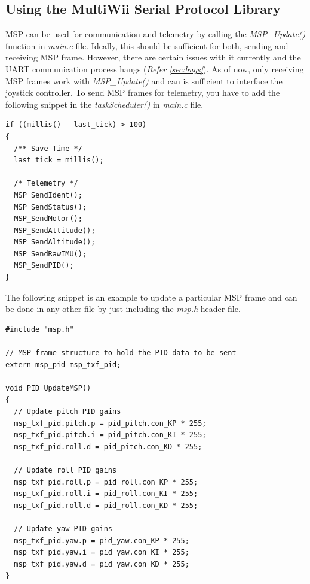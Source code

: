 \documentclass[a4paper,12pt,oneside]{book}
\begin{document}
\subsection{Using the MultiWii Serial Protocol Library}
MSP can be used for communication and telemetry by calling the \textit{MSP{\_}Update()} function in \textit{main.c} file. Ideally, this should be sufficient for both, sending and receiving MSP frame. However, there are certain issues with it currently and the UART communication process hangs (\textit{Refer \autoref{sec:bugs}}). As of now, only receiving MSP frames work with \textit{MSP{\_}Update()} and can is sufficient to interface the joystick controller. To send MSP frames for telemetry, you have to add the following snippet in the \textit{taskScheduler()} in \textit{main.c} file.\\

\begin{verbatim}
if ((millis() - last_tick) > 100)
{
  /** Save Time */
  last_tick = millis();

  /* Telemetry */
  MSP_SendIdent();
  MSP_SendStatus();
  MSP_SendMotor();
  MSP_SendAttitude();
  MSP_SendAltitude();
  MSP_SendRawIMU();
  MSP_SendPID();
}
\end{verbatim}

\bigskip

The following snippet is an example to update a particular MSP frame and can be done in any other file by just including the \textit{msp.h} header file.\\

\begin{verbatim}
#include "msp.h"

// MSP frame structure to hold the PID data to be sent
extern msp_pid msp_txf_pid;

void PID_UpdateMSP()
{
  // Update pitch PID gains
  msp_txf_pid.pitch.p = pid_pitch.con_KP * 255;
  msp_txf_pid.pitch.i = pid_pitch.con_KI * 255;
  msp_txf_pid.roll.d = pid_pitch.con_KD * 255;

  // Update roll PID gains
  msp_txf_pid.roll.p = pid_roll.con_KP * 255;
  msp_txf_pid.roll.i = pid_roll.con_KI * 255;
  msp_txf_pid.roll.d = pid_roll.con_KD * 255;

  // Update yaw PID gains
  msp_txf_pid.yaw.p = pid_yaw.con_KP * 255;
  msp_txf_pid.yaw.i = pid_yaw.con_KI * 255;
  msp_txf_pid.yaw.d = pid_yaw.con_KD * 255;
}
\end{verbatim}

\clearpage
\end{document}
